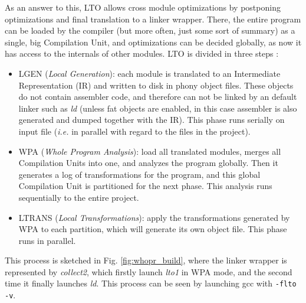 \documentclass[runningheads]{llncs}
\begin{document}
As an answer to this, LTO allows cross module optimizations by
postponing optimizations and final translation to a linker wrapper. There, the entire
program can be loaded by the compiler (but more often, just some sort of summary)
as a single, big Compilation Unit, and optimizations can be decided globally,
as now it has access to the internals of other modules. LTO is divided in
three steps \cite{whoprgoogle,glek2010optimizing}:
\begin{itemize}
\item LGEN (\textit{Local Generation}): each module is translated to an Intermediate
Representation (IR) and written to disk in phony object files. These objects do
not contain assembler code, and therefore can not be linked by an default linker
such as \textit{ld} (unless fat objects are enabled, in this case assembler is also
generated and dumped together with the IR). This phase runs serially
on input file (\textit{i.e.} in parallel with regard to the files in the project).

\item WPA (\textit{Whole Program Analysis}): load all translated modules, merges
all Compilation Units into one, and analyzes the program globally.
Then it generates a log of transformations for the program, and this global
Compilation Unit is partitioned for the next phase. This analysis runs sequentially
to the entire project.

\item LTRANS (\textit{Local Transformations}): apply the transformations generated by
WPA to each partition, which will generate its own object file. This phase runs in
parallel.
\end{itemize}

This process is sketched in Fig. \ref{fig:whopr_build}, where the linker wrapper is
represented by \textit{collect2}, which firstly launch \textit{lto1} in WPA mode, and the second
time it finally launches \textit{ld}. This process can be seen by launching gcc with \texttt{-flto -v}.
\end{document}
